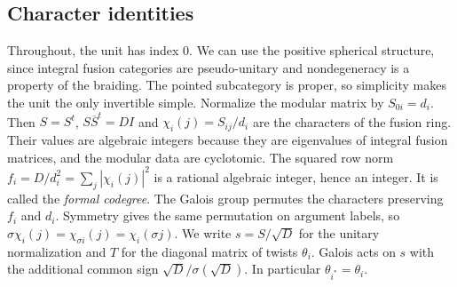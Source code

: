 \documentclass[11pt]{amsart}
\numberwithin{equation}{section}
\begin{document}
\subsection{Character identities}
Throughout, the unit has index $0$. We can use the positive
spherical structure, since integral fusion categories are
pseudo-unitary \cite[Proposition~8.24]{ENOannals} and
nondegeneracy is a property of the braiding. The pointed subcategory
is proper, so simplicity makes the unit the only invertible simple.
Normalize the modular matrix by $S_{0i}=d_i$. Then
$S=S^t$, $S\overline S^t=DI$ and $\chi_i(j)=S_{ij}/d_i$ are the
characters of the fusion ring. Their values are algebraic integers because they are eigenvalues of
integral fusion matrices, and the modular data are cyclotomic. The squared row norm
$f_i=D/d_i^2=\sum_j|\chi_i(j)|^2$ is a rational algebraic integer,
hence an integer. It is called the \emph{formal codegree}. The Galois
group permutes the characters preserving $f_i$ and $d_i$. Symmetry gives the same permutation on argument labels, so
$\sigma\chi_i(j)=\chi_{\sigma i}(j)=\chi_i(\sigma j)$.
We write $s=S/\sqrt D$ for the unitary normalization and $T$ for
the diagonal matrix of twists $\theta_i$. Galois acts on $s$ with
the additional common sign $\sqrt D/\sigma(\sqrt D)$. In particular $\theta_{i^*}=\theta_i$.
\end{document}
